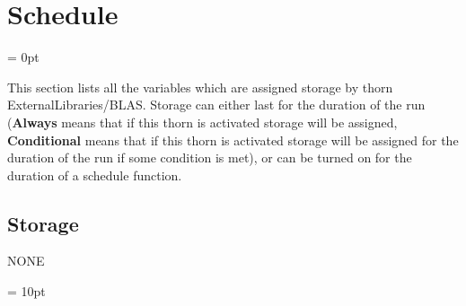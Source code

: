 
\section{Schedule} 


\parskip = 0pt


\noindent This section lists all the variables which are assigned storage by thorn ExternalLibraries/BLAS.  Storage can either last for the duration of the run ({\bf Always} means that if this thorn is activated storage will be assigned, {\bf Conditional} means that if this thorn is activated storage will be assigned for the duration of the run if some condition is met), or can be turned on for the duration of a schedule function.


\subsection*{Storage}NONE

\vspace{5mm}\parskip = 10pt 
